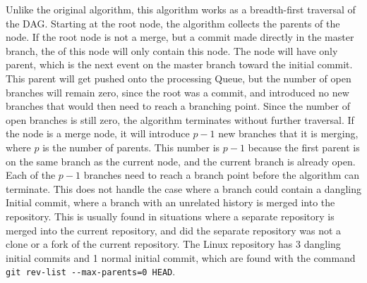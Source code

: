 Unlike the original algorithm, this algorithm works as a breadth-first
traversal of the DAG. Starting at the root node, the algorithm collects
the parents of the node. If the root node is not a merge, but a commit
made directly in the master branch, the \mt{} of this node will only
contain this node. The node will have only parent, which is the next
event on the master branch toward the initial commit. This parent will
get pushed onto the processing Queue, but the number of open branches
will remain zero, since the root was a commit, and introduced no new
branches that would then need to reach a branching point. Since the
number of open branches is still zero, the algorithm terminates without
further traversal. If the node is a merge node, it will introduce $p -
1$ new branches that it is merging, where $p$ is the number of parents.
This number is $p - 1$ because the first parent is on the same branch as
the current node, and the current branch is already open. Each of the
$p-1$ branches need to reach a branch point before the algorithm can
terminate. This does not handle the case where a branch could contain a
dangling Initial commit, where a branch with an unrelated history is
merged into the repository. This is usually found in situations where a
separate repository is merged into the current repository, and did the
separate repository was not a clone or a fork of the current repository.
The Linux repository has 3 dangling initial commits and 1 normal initial
commit, which are found with the command
\verb|git rev-list --max-parents=0 HEAD|.

